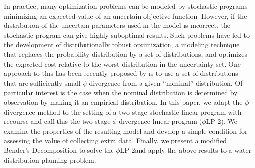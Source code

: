 \documentclass[ijoc,nonblindrev]{informs3} %
\newcommand{\plp}{$\phi$LP-2}
\begin{document}
 

In practice, many optimization problems can be modeled by stochastic programs minimizing an expected value of an uncertain objective function.
However, if the distribution of the uncertain parameters used in the model is incorrect, the stochastic program can give highly suboptimal results.
Such problems have led to the development of distributionally robust optimization, a modeling technique that replaces the probability distribution by a set of distributions, and optimizes the expected cost relative to the worst distribution in the uncertainty set.
One approach to this has been recently proposed by \cite{bental2011robust} is to use a set of distributions that are sufficiently small $\phi$-divergence from a given ``nominal'' distribution.
Of particular interest is the case when the nominal distribution is determined by observation by making it an empirical distribution.
In this paper, we adapt the $\phi$-divergence method to the setting of a two-stage stochastic linear program with recourse and call this the two-stage $\phi$-divergence linear program (\plp). 
We examine the properties of the resulting model and develop a simple condition for assessing the value of collecting extra data.
Finally, we present a modified Bender's Decomposition to solve the \plp and apply the above results to a water distribution planning problem.
\end{document}
